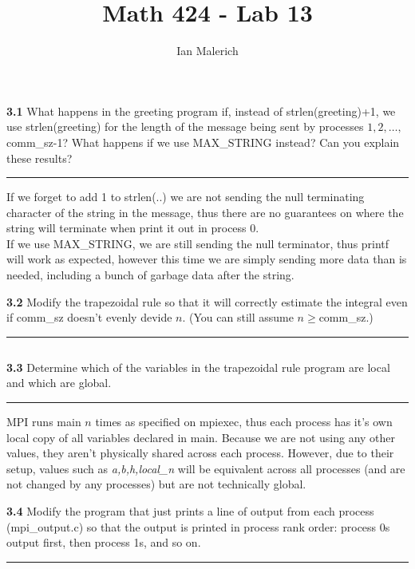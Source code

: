 \documentclass[12pt]{jhwhw}
\author{Ian Malerich}
\title{Math 424 - Lab 13}
\begin{document}
\raggedright


\textbf{3.1}
	What happens in the greeting program if, instead of strlen(greeting)+1,
	we use strlen(greeting) for the length of the message being sent
	by processes $1,2,\ldots,$comm_sz-1? What happens if we use MAX_STRING instead?
	Can you explain these results?
\textcolor[RGB]{240,240,240}{\rule{\textwidth}{0.5pt}}\bigbreak

	\begin{addmargin}[1em]{}
		If we forget to add 1 to strlen(..) we are not sending the null terminating
		character of the string in the message, thus there are no guarantees on
		where the string will terminate when print it out in process 0. \\
		If we use MAX_STRING, we are still sending the null terminator, thus
		printf will work as expected, however this time we are simply sending
		more data than is needed, including a bunch of garbage data after the string. \\
	\end{addmargin}

\textbf{3.2}
	Modify the trapezoidal rule so that it will correctly estimate the integral
	even if comm_sz doesn't evenly devide $n$. (You can still assume $n\geq$comm_sz.)
\textcolor[RGB]{240,240,240}{\rule{\textwidth}{0.5pt}}\bigbreak

	\begin{addmargin}[1em]{}
		\inputminted{c}{3.2.c}
	\end{addmargin}

\textbf{3.3}
	Determine which of the variables in the trapezoidal rule program are local and which 
	are global.
\textcolor[RGB]{240,240,240}{\rule{\textwidth}{0.5pt}}\bigbreak

	\begin{addmargin}[1em]{}
		MPI runs main $n$ times as specified on mpiexec, thus each process has it's own local copy
		of all variables declared in main. Because we are not using any other values, they aren't
		physically shared across each process. However, due to their setup, values such as 
		\textit{a,b,h,local_n} will be equivalent across all processes (and are not changed by 
		any processes) but are not technically global.
	\end{addmargin}

\clearpage
\textbf{3.4}
	Modify the program that just prints a line of output from each process (mpi_output.c) so
	that the output is printed in process rank order: process 0s output first, then process 1s,
	and so on.
\textcolor[RGB]{240,240,240}{\rule{\textwidth}{0.5pt}}\bigbreak

	\begin{addmargin}[1em]{}
		\inputminted{c}{3.4.c}
	\end{addmargin}
\end{document}
